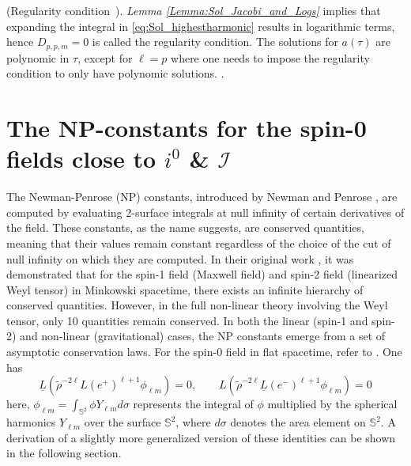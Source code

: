 \begin{remark}\label{Remark:logfreeRemark}(Regularity condition~\cite{MinMacKro22}).
  \emph{Lemma \ref{Lemma:Sol_Jacobi_and_Logs}} implies that expanding the integral in \eqref{eq:Sol_highestharmonic} results in logarithmic terms, hence
  $D_{p,p,m} = 0$ is called the regularity condition. The solutions for
  $a(\tau)$ are polynomic in $\tau$, except for $\ell = p$ where one needs
  to impose the regularity condition to only have polynomic
  solutions. \cite{MinMacKro22}.
\end{remark}
\chapter{The NP-constants for the spin-0 fields close to $i^0$ \& $\mathscr{I}$}
\label{chapter:NPConstants}


The Newman-Penrose (NP) constants, introduced by Newman and Penrose \cite{NewPen68}, are computed by evaluating 2-surface integrals at null infinity of certain derivatives of the field. These constants, as the name suggests, are conserved quantities, meaning that their values remain constant regardless of the choice of the cut of null infinity on which they are computed. In their original work \cite{NewPen68}, it was demonstrated that for the spin-1 field (Maxwell field) and spin-2 field (linearized Weyl tensor) in Minkowski spacetime, there exists an infinite hierarchy of conserved quantities. However, in the full non-linear theory involving the Weyl tensor, only 10 quantities remain conserved. In both the linear (spin-1 and spin-2) and non-linear (gravitational) cases, the NP constants emerge from a set of asymptotic conservation laws. For the spin-0 field in flat spacetime, refer to \cite{Keh21_a}. One has
\begin{equation}\label{eq:cons_laws}
  {\underline{{L}}}({\tilde{\rho}}^{-2\ell}L(e^{+})^{\ell+1}\phi_{\ell m})=0, \qquad L({\tilde{\rho}}^{-2\ell}\underline{L}(e^{-})^{\ell+1}\phi_{\ell m})=0
\end{equation}
here, $\phi_{\ell m}= \int_{\mathbb{S}^2} \phi  Y_{\ell m}  d\sigma$ represents the integral of $\phi$ multiplied by the spherical harmonics $Y_{\ell m}$ over the surface $\mathbb{S}^2$, where $d\sigma$ denotes the area element on $\mathbb{S}^2$. A derivation of a slightly more generalized version of these identities can be shown in the following section.

